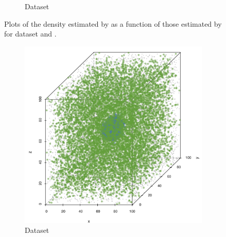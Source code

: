 \begin{figure}
\begin{subfigure}{0.23\textwidth}
				\caption{Dataset \baakmanThree}
				\label{fig:discussion:performance:mbevssambe:baakman3}
			\end{subfigure}	
			\caption{Plots of the density estimated by \sambe as a function of those estimated by \mbe for dataset %
				\ferdosiThree and %
				\baakmanThree.
			}
			\label{fig:discussion:performance:four:mbevssambe}
		\end{figure}

	\begin{figure}
		\centering
		\begin{subfigure}{0.23\textwidth}
			\centering
			\includegraphics[keepaspectratio=true, width=\textwidth, height=0.23\textheight]{discussion/img/ferdosi_1_abs_error_mbeSmallerThansambe}
			\caption{Dataset \ferdosiOne}
			\label{fig:discussion:performance:mbeLowerError:ferdosi1}
		\end{subfigure}
		\begin{subfigure}{0.23\textwidth}
			\centering

\end{subfigure}
\end{figure}
